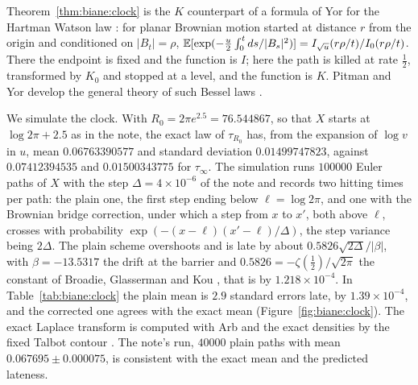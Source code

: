 \begin{remark}\label{rem:biane:hw}
Theorem~\ref{thm:biane:clock} is the $K$ counterpart of a formula of Yor \cite{Yor80} for the Hartman Watson law \cite{HartmanWatson74}: for planar Brownian motion started at distance $r$ from the origin and conditioned on $|B_t|=\rho$, $\mathbb{E}[\exp(-\frac u2\int_0^tds/|B_s|^2)]=I_{\sqrt u}(r\rho/t)/I_0(r\rho/t)$. There the endpoint is fixed and the function is $I$; here the path is killed at rate $\frac12$, transformed by $K_0$ and stopped at a level, and the function is $K$. Pitman and Yor develop the general theory of such Bessel laws \cite{PitmanYor81}.
\end{remark}

We simulate the clock. With $R_0=2\pi e^{2.5}=76.544867$, so that $X$ starts at $\log2\pi+2.5$ as in the note, the exact law of $\tau_{R_0}$ has, from the expansion of $\log v$ in $u$, mean $0.06763390577$ and standard deviation $0.01499747823$, against $0.07412394535$ and $0.01500343775$ for $\tau_\infty$. The simulation runs $100000$ Euler paths of $X$ with the step $\Delta=4\times10^{-6}$ of the note and records two hitting times per path: the plain one, the first step ending below $\ell=\log2\pi$, and one with the Brownian bridge correction, under which a step from $x$ to $x'$, both above $\ell$, crosses with probability $\exp(-(x-\ell)(x'-\ell)/\Delta)$, the step variance being $2\Delta$. The plain scheme overshoots and is late by about $0.5826\sqrt{2\Delta}/|\beta|$, with $\beta=-13.5317$ the drift at the barrier and $0.5826=-\zeta(\frac12)/\sqrt{2\pi}$ the constant of Broadie, Glasserman and Kou \cite{BGK97}, that is by $1.218\times10^{-4}$. In Table~\ref{tab:biane:clock} the plain mean is $2.9$ standard errors late, by $1.39\times10^{-4}$, and the corrected one agrees with the exact mean (Figure~\ref{fig:biane:clock}). The exact Laplace transform is computed with Arb and the exact densities by the fixed Talbot contour \cite{Talbot79,AbateValko04}. The note's run, $40000$ plain paths with mean $0.067695\pm0.000075$, is consistent with the exact mean and the predicted lateness.

